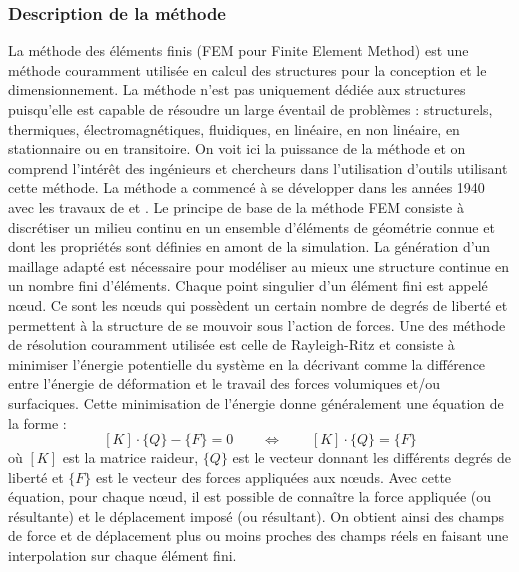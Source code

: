 		\subsubsection{Description de la méthode}
			La méthode des éléments finis (FEM pour Finite Element Method) est une méthode couramment utilisée en calcul des structures pour la conception et le dimensionnement. La méthode n'est pas uniquement dédiée aux structures puisqu'elle est capable de résoudre un large éventail de problèmes : structurels, thermiques, électromagnétiques, fluidiques, en linéaire, en non linéaire, en stationnaire ou en transitoire. On voit ici la puissance de la méthode et on comprend l'intérêt des ingénieurs et chercheurs dans l'utilisation d'outils utilisant cette méthode. La méthode a commencé à se développer dans les années 1940 avec les travaux de \citet{hrennikoff_solution_1941} et \citet{courant_variational_1943}. Le principe de base de la méthode FEM consiste à discrétiser un milieu continu en un ensemble d'éléments de géométrie connue et dont les propriétés sont définies en amont de la simulation. La génération d'un maillage adapté est nécessaire pour modéliser au mieux une structure continue en un nombre fini d'éléments. Chaque point singulier d'un élément fini est appelé n\oe{}ud. Ce sont les n\oe{}uds qui possèdent un certain nombre de degrés de liberté et permettent à la structure de se mouvoir sous l'action de forces. Une des méthode de résolution couramment utilisée est celle de Rayleigh-Ritz et consiste à minimiser l'énergie potentielle du système en la décrivant comme la différence entre l'énergie de déformation et le travail des forces volumiques et/ou surfaciques. Cette minimisation de l'énergie donne généralement une équation de la forme :
			\begin{equation}\label{eq03:equation_FEM}
				[K]\cdot \{Q\} - \{F\} = 0 \qquad \Leftrightarrow \qquad [K]\cdot \{Q\} = \{F\}
			\end{equation}
			où $[K]$ est la matrice raideur, $\{Q\}$ est le vecteur donnant les différents degrés de liberté et $\{F\}$ est le vecteur des forces appliquées aux n\oe{}uds. Avec cette équation, pour chaque n\oe{}ud, il est possible de connaître la force appliquée (ou résultante) et le déplacement imposé (ou résultant). On obtient ainsi des champs de force et de déplacement plus ou moins proches des champs réels en faisant une interpolation sur chaque élément fini.
